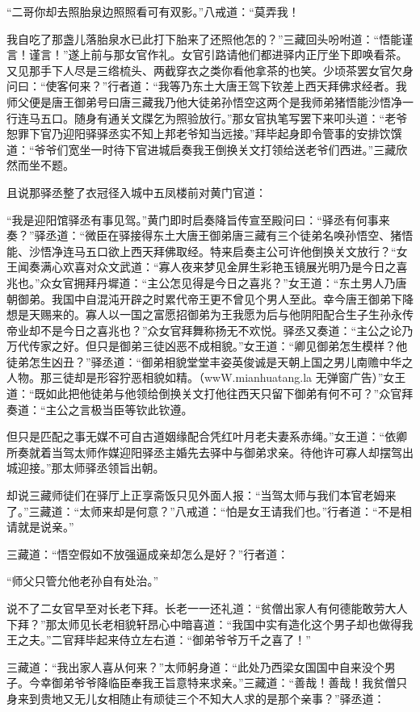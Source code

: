 \documentclass[12pt,UTF8]{ctexbook}
\begin{document}
“二哥你却去照胎泉边照照看可有双影。”八戒道：“莫弄我！

我自吃了那盏儿落胎泉水已此打下胎来了还照他怎的？”三藏回头吩咐道：“悟能谨言！谨言！”遂上前与那女官作礼。女官引路请他们都进驿内正厅坐下即唤看茶。又见那手下人尽是三绺梳头、两截穿衣之类你看他拿茶的也笑。少顷茶罢女官欠身问曰：“使客何来？”行者道：“我等乃东土大唐王驾下钦差上西天拜佛求经者。我师父便是唐王御弟号曰唐三藏我乃他大徒弟孙悟空这两个是我师弟猪悟能沙悟净一行连马五口。随身有通关文牒乞为照验放行。”那女官执笔写罢下来叩头道：“老爷恕罪下官乃迎阳驿驿丞实不知上邦老爷知当远接。”拜毕起身即令管事的安排饮馔道：“爷爷们宽坐一时待下官进城启奏我王倒换关文打领给送老爷们西进。”三藏欣然而坐不题。

且说那驿丞整了衣冠径入城中五凤楼前对黄门官道：

“我是迎阳馆驿丞有事见驾。”黄门即时启奏降旨传宣至殿问曰：“驿丞有何事来奏？”驿丞道：“微臣在驿接得东土大唐王御弟唐三藏有三个徒弟名唤孙悟空、猪悟能、沙悟净连马五口欲上西天拜佛取经。特来启奏主公可许他倒换关文放行？“女王闻奏满心欢喜对众文武道：“寡人夜来梦见金屏生彩艳玉镜展光明乃是今日之喜兆也。”众女官拥拜丹墀道：“主公怎见得是今日之喜兆？”女王道：“东土男人乃唐朝御弟。我国中自混沌开辟之时累代帝王更不曾见个男人至此。幸今唐王御弟下降想是天赐来的。寡人以一国之富愿招御弟为王我愿为后与他阴阳配合生子生孙永传帝业却不是今日之喜兆也？”众女官拜舞称扬无不欢悦。驿丞又奏道：“主公之论乃万代传家之好。但只是御弟三徒凶恶不成相貌。”女王道：“卿见御弟怎生模样？他徒弟怎生凶丑？”驿丞道：“御弟相貌堂堂丰姿英俊诚是天朝上国之男儿南赡中华之人物。那三徒却是形容狞恶相貌如精。（wwW.mianhuatang.la 无弹窗广告）”女王道：“既如此把他徒弟与他领给倒换关文打他往西天只留下御弟有何不可？”众官拜奏道：“主公之言极当臣等钦此钦遵。

但只是匹配之事无媒不可自古道姻缘配合凭红叶月老夫妻系赤绳。”女王道：“依卿所奏就着当驾太师作媒迎阳驿丞主婚先去驿中与御弟求亲。待他许可寡人却摆驾出城迎接。”那太师驿丞领旨出朝。

却说三藏师徒们在驿厅上正享斋饭只见外面人报：“当驾太师与我们本官老姆来了。”三藏道：“太师来却是何意？”八戒道：“怕是女王请我们也。”行者道：“不是相请就是说亲。”

三藏道：“悟空假如不放强逼成亲却怎么是好？”行者道：

“师父只管允他老孙自有处治。”

说不了二女官早至对长老下拜。长老一一还礼道：“贫僧出家人有何德能敢劳大人下拜？”那太师见长老相貌轩昂心中暗喜道：“我国中实有造化这个男子却也做得我王之夫。”二官拜毕起来侍立左右道：“御弟爷爷万千之喜了！”

三藏道：“我出家人喜从何来？”太师躬身道：“此处乃西梁女国国中自来没个男子。今幸御弟爷爷降临臣奉我王旨意特来求亲。”三藏道：“善哉！善哉！我贫僧只身来到贵地又无儿女相随止有顽徒三个不知大人求的是那个亲事？”驿丞道：
\end{document}
